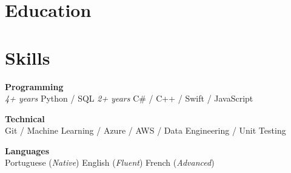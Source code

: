\documentclass[10pt]{aqresume}
\begin{document}
  \section{Education}

  \section{Skills}
    \vspace*{-1\multicolsep}
    \begin{multicols*}{3}
      []
      \raggedright\textbf{Programming}\\
      \textit{4+ years} Python / SQL\newline
      \textit{2+ years} C\# / C++ / Swift / JavaScript
      \vfill\null
      \columnbreak

      \textbf{Technical}\\
      Git / Machine Learning / Azure / AWS / Data Engineering / Unit Testing
      \vfill\null
      \columnbreak

      \textbf{Languages}\\
      Portuguese (\textit{Native})\newline
      English (\textit{Fluent})\newline
      French (\textit{Advanced})
    \end{multicols*}
\end{document}
